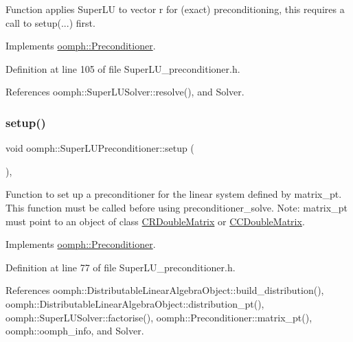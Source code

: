 Function applies Super\+LU to vector r for (exact) preconditioning, this requires a call to setup(...) first. 



Implements \hyperlink{classoomph_1_1Preconditioner_ace1199369e4465cd2b9a34884bb64ec8}{oomph\+::\+Preconditioner}.



Definition at line 105 of file Super\+L\+U\+\_\+preconditioner.\+h.



References oomph\+::\+Super\+L\+U\+Solver\+::resolve(), and Solver.

\mbox{\label{classoomph_1_1SuperLUPreconditioner_a7a53307202af7c06a2a6b336e943b1b4}} 
\subsubsection{\texorpdfstring{setup()}{setup()}}
{\footnotesize\ttfamily void oomph\+::\+Super\+L\+U\+Preconditioner\+::setup (\begin{DoxyParamCaption}{ }\end{DoxyParamCaption})\hspace{0.3cm}{\ttfamily [inline]}, {\ttfamily [virtual]}}



Function to set up a preconditioner for the linear system defined by matrix\+\_\+pt. This function must be called before using preconditioner\+\_\+solve. Note\+: matrix\+\_\+pt must point to an object of class \hyperlink{classoomph_1_1CRDoubleMatrix}{C\+R\+Double\+Matrix} or \hyperlink{classoomph_1_1CCDoubleMatrix}{C\+C\+Double\+Matrix}. 



Implements \hyperlink{classoomph_1_1Preconditioner_af4886f4efe510e5c9b0eb19422943588}{oomph\+::\+Preconditioner}.



Definition at line 77 of file Super\+L\+U\+\_\+preconditioner.\+h.



References oomph\+::\+Distributable\+Linear\+Algebra\+Object\+::build\+\_\+distribution(), oomph\+::\+Distributable\+Linear\+Algebra\+Object\+::distribution\+\_\+pt(), oomph\+::\+Super\+L\+U\+Solver\+::factorise(), oomph\+::\+Preconditioner\+::matrix\+\_\+pt(), oomph\+::oomph\+\_\+info, and Solver.



